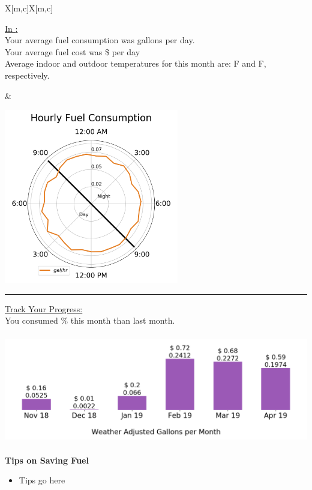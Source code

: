 \documentclass[12pt,a4paper]{article}
\begin{document}
\begin{tabu}{X[m,c]X[m,c]}

\begin{minipage}{\linewidth}
\underline{In {\reportmonth:}}\\

Your average fuel consumption was {\fuelperday} gallons per day.\\

Your average fuel cost was \${\fuelcostperday} per day\\

Average indoor and outdoor temperatures for this month are: {\inTave} {\degree}F and {\outTave} {\degree}F, respectively.\\
\end{minipage}

&

\begin{minipage}{\linewidth}
\includegraphics[height = 3in]{monthly_polar_plot.png}
\end{minipage}


\end{tabu}

\rule{\textwidth}{1pt}
\newline

\underline{Track Your Progress:}\\

You consumed {\progress}\% {\progressmoreless} this month than last month.\\
\begin{center}
\includegraphics[height= 1.875in]{monthly_track_your_progress.png}
\end{center}

\newpage
\renewcommand{\headsep}{14pt}
\fancyfoot{}
\begin{center}
\textbf{\Huge{Tips on Saving Fuel}}
\end{center}

\vspace{12pt}
\begin{itemize}
\item Tips go here
\end{itemize}
\end{document}
